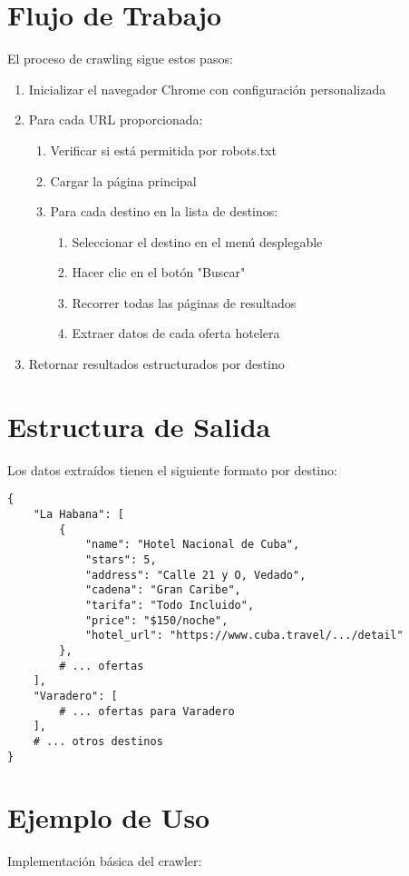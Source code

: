 \documentclass[a4paper,11pt]{article}
\begin{document}
\section{Flujo de Trabajo}
El proceso de crawling sigue estos pasos:
\begin{enumerate}
    \item Inicializar el navegador Chrome con configuración personalizada
    \item Para cada URL proporcionada:
    \begin{enumerate}
        \item Verificar si está permitida por robots.txt
        \item Cargar la página principal
        \item Para cada destino en la lista de destinos:
        \begin{enumerate}
            \item Seleccionar el destino en el menú desplegable
            \item Hacer clic en el botón "Buscar"
            \item Recorrer todas las páginas de resultados
            \item Extraer datos de cada oferta hotelera
        \end{enumerate}
    \end{enumerate}
    \item Retornar resultados estructurados por destino
\end{enumerate}

\section{Estructura de Salida}
Los datos extraídos tienen el siguiente formato por destino:

\begin{lstlisting}[caption=Estructura de datos de salida]
{
    "La Habana": [
        {
            "name": "Hotel Nacional de Cuba",
            "stars": 5,
            "address": "Calle 21 y O, Vedado",
            "cadena": "Gran Caribe",
            "tarifa": "Todo Incluido",
            "price": "$150/noche",
            "hotel_url": "https://www.cuba.travel/.../detail"
        },
        # ... ofertas
    ],
    "Varadero": [
        # ... ofertas para Varadero
    ],
    # ... otros destinos
}
\end{lstlisting}

\section{Ejemplo de Uso}
Implementación básica del crawler:
\end{document}
